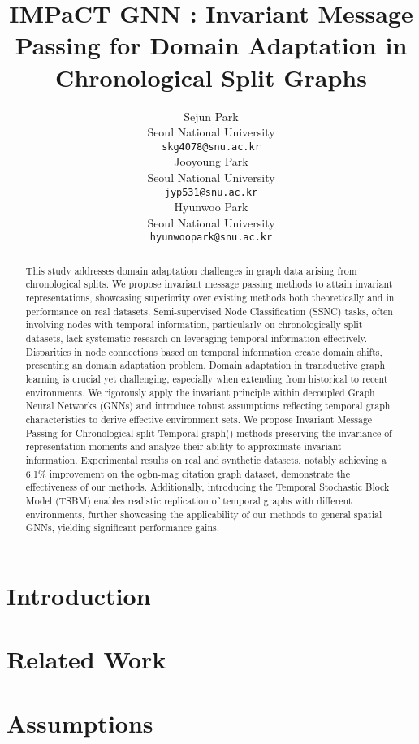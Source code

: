 \documentclass{article}
\title{IMPaCT GNN : Invariant Message Passing for Domain Adaptation in Chronological Split Graphs}
\author{%
  Sejun Park\\
  Seoul National University\\
  \texttt{skg4078@snu.ac.kr} \\
  \And
 Jooyoung Park\\
 Seoul National University\\
 \texttt{jyp531@snu.ac.kr}\\
  \And
  Hyunwoo Park\\
  Seoul National University\\
  \texttt{hyunwoopark@snu.ac.kr} \\
}
\begin{document}
\maketitle


\begin{abstract}
This study addresses domain adaptation challenges in graph data arising from chronological splits. We propose invariant message passing methods to attain invariant representations, showcasing superiority over existing methods both theoretically and in performance on real datasets. Semi-supervised Node Classification (SSNC) tasks, often involving nodes with temporal information, particularly on chronologically split datasets, lack systematic research on leveraging temporal information effectively. Disparities in node connections based on temporal information create domain shifts, presenting an domain adaptation problem. Domain adaptation in transductive graph learning is crucial yet challenging, especially when extending from historical to recent environments. We rigorously apply the invariant principle within decoupled Graph Neural Networks (GNNs) and introduce robust assumptions reflecting temporal graph characteristics to derive effective environment sets. We propose Invariant Message Passing for Chronological-split Temporal graph(\IMPaCT) methods preserving the invariance of representation moments and analyze their ability to approximate invariant information. Experimental results on real and synthetic datasets, notably achieving a 6.1\% improvement on the ogbn-mag citation graph dataset, demonstrate the effectiveness of our methods. Additionally, introducing the Temporal Stochastic Block Model (TSBM) enables realistic replication of temporal graphs with different environments, further showcasing the applicability of our methods to general spatial GNNs, yielding significant performance gains.
\end{abstract}


\section{Introduction}


\section{Related Work}


\section{Assumptions}

\end{document}
